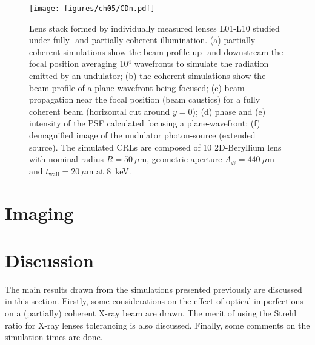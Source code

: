 \begin{refsection}
\begin{figure}[t]
        \centering
        {\texttt{[image: figures/ch05/CDn.pdf]}}
        \caption[L01-L10 studied under fully- and partially-coherent illuminations]{Lens stack formed by individually measured lenses L01-L10 studied under fully- and partially-coherent illumination. (a) partially-coherent simulations show the beam profile up- and downstream the focal position averaging 10$^{4}$ wavefronts to simulate the radiation emitted by an undulator; (b) the coherent simulations show the beam profile of a plane wavefront being focused; (c) beam propagation near the focal position (beam caustics) for a fully coherent beam (horizontal cut around $y=0$); (d) phase and (e) intensity of the PSF calculated focusing a plane-wavefront; (f) demagnified image of the undulator photon-source (extended source). The simulated CRLs are composed of 10 2D-Beryllium lens with nominal radius $R=50~\mu\text{m}$, geometric aperture $A_{\diameter}=440~\mu\text{m}$ and $t_\text{wall}=20~\mu$m at 8~keV.}\label{fig:CDnS}
\end{figure}

\clearpage

\section{Imaging}\label{sec:imaging_sim}
\section{Discussion}\label{sec:discussion}

The main results drawn from the simulations presented previously are discussed in this section. Firstly, some considerations on the effect of optical imperfections on a (partially) coherent X-ray beam are drawn. The merit of using the Strehl ratio for X-ray lenses tolerancing is also discussed. Finally, some comments on the simulation times are done.


\end{refsection}
